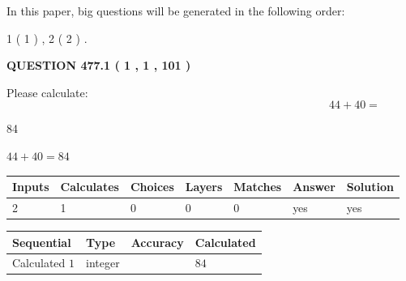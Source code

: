 \documentclass[12pt]{article}
\begin{document}
In this paper, big questions will be generated in the following order: 
   
   
   1 ( 1 )
 ,
   2 ( 2 )
 .
  
\vspace{0.2in}
  
{\textbf{\Large{QUESTION
477.1 
 ( 1 , 1 , 101 )
}}}
  
  
 
Please calculate:
\begin{equation}
44 +  %
40 = \nonumber
\end{equation}
 
 
 
\noindent{}
 
 

84
 
 
\noindent{}
 
 

 
 
 
\noindent{}
 
 

$ %
44 +  %
40=   %
84$
 
 
\noindent{}
 
 

 
   
   
   
   
\noindent\begin{tabular}{|l|l|l|l|l|l|l|}
 \hline
Inputs & Calculates & Choices & Layers & Matches & Answer & Solution \\ \hline
 2  & 
 1  & 
 0
  & 
 0  & 
 0  & 
  yes & 
  yes 
  \\ \hline
 \end{tabular}
   
   
   
   
\noindent{}
   
   
  
  
\noindent\begin{tabular}{|l|l|l|l|}
\hline
 Sequential & Type & Accuracy & Calculated \\ 
\hline
 
 
  Calculated $  1 $ & integer &  & 
  $ 84 $ 
 \\  \hline  
 \end{tabular}
   
\end{document}
